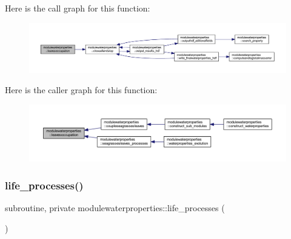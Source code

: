 Here is the call graph for this function\+:\nopagebreak
\begin{figure}[H]
\begin{center}
\leavevmode
\includegraphics[width=350pt]{namespacemodulewaterproperties_ac74bdef93cc8e54e691452462dce15da_cgraph}
\end{center}
\end{figure}
Here is the caller graph for this function\+:\nopagebreak
\begin{figure}[H]
\begin{center}
\leavevmode
\includegraphics[width=350pt]{namespacemodulewaterproperties_ac74bdef93cc8e54e691452462dce15da_icgraph}
\end{center}
\end{figure}
\mbox{\label{namespacemodulewaterproperties_ad72c8ac146887990ee173526b0a484f1}} 
\subsubsection{\texorpdfstring{life\+\_\+processes()}{life\_processes()}}
{\footnotesize\ttfamily subroutine, private modulewaterproperties\+::life\+\_\+processes (\begin{DoxyParamCaption}{ }\end{DoxyParamCaption})\hspace{0.3cm}{\ttfamily [private]}}

